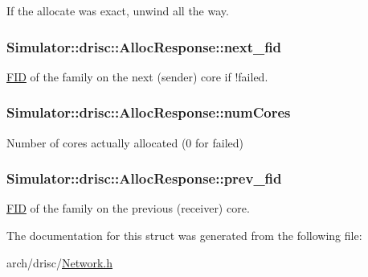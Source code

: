 If the allocate was exact, unwind all the way. 

\hypertarget{struct_simulator_1_1drisc_1_1_alloc_response_a0f4a4d54a9d59adb1bebd90b8b2fab8e}{
\subsubsection[{next\+\_\+fid}]{ Simulator\+::drisc\+::\+Alloc\+Response\+::next\+\_\+fid}}\label{struct_simulator_1_1drisc_1_1_alloc_response_a0f4a4d54a9d59adb1bebd90b8b2fab8e}


\hyperlink{struct_simulator_1_1_f_i_d}{F\+I\+D} of the family on the next (sender) core if !failed. 

\hypertarget{struct_simulator_1_1drisc_1_1_alloc_response_a4e5ebf0f9fa1e8c87270468ab10eba8e}{
\subsubsection[{num\+Cores}]{ Simulator\+::drisc\+::\+Alloc\+Response\+::num\+Cores}}\label{struct_simulator_1_1drisc_1_1_alloc_response_a4e5ebf0f9fa1e8c87270468ab10eba8e}


Number of cores actually allocated (0 for failed) 

\hypertarget{struct_simulator_1_1drisc_1_1_alloc_response_a75a1c47e8373c49d9b6b50f8ea683dee}{
\subsubsection[{prev\+\_\+fid}]{ Simulator\+::drisc\+::\+Alloc\+Response\+::prev\+\_\+fid}}\label{struct_simulator_1_1drisc_1_1_alloc_response_a75a1c47e8373c49d9b6b50f8ea683dee}


\hyperlink{struct_simulator_1_1_f_i_d}{F\+I\+D} of the family on the previous (receiver) core. 



The documentation for this struct was generated from the following file\+:\begin{DoxyCompactItemize}
\item 
arch/drisc/\hyperlink{_network_8h}{Network.\+h}\end{DoxyCompactItemize}
